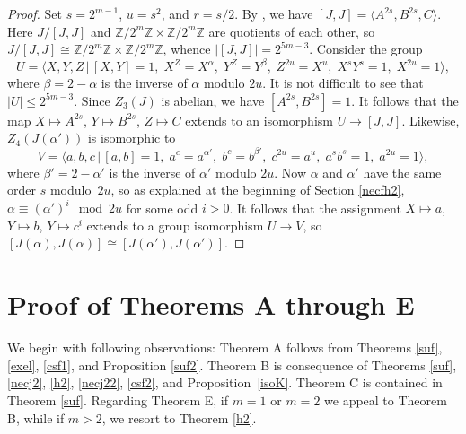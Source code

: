 \documentclass{amsart}
\newtheorem{note}[theorem]{Note}
\theoremstyle{definition}
\theoremstyle{remark}
\newcommand \Z{{\mathbb Z}}
\begin{document}
\begin{proof}
Set $s=2^{m-1}$, $u=s^2$, and $r=s/2$. By \cite[Theorem 8.1]{MS}, we have $[J,J]=\langle A^{2s},B^{2s},C\rangle$.
Here $J/[J,J]$ and $\Z/2^{m}\Z\times \Z/2^{m}\Z$ are quotients of each other, so
$J/[J,J]\cong\Z/2^{m}\Z\times \Z/2^{m}\Z$, whence $|[J,J]|=2^{5m-3}$. Consider the group
\[
U=\langle X,Y,Z\,|\,
    [X,Y]=1,\;
    X^Z=X^\alpha,\;
    Y^Z=Y^{\beta},\;
    Z^{2u}=X^{u},\;
    X^{s}Y^{s}=1,\;
    X^{2u}=1\rangle,
 \]
where $\beta=2-\alpha$ is the inverse of $\alpha$ modulo $2u$.
It is not difficult to see that $|U|\leq 2^{5m-3}$. Since $Z_3(J)$ is abelian, we have $[A^{2s},B^{2s}]=1$.
It follows that the map $X\mapsto A^{2s}$, $Y\mapsto B^{2s}$, $Z\mapsto C$ extends to an isomorphism $U\to [J,J]$.
Likewise, $Z_4(J(\alpha'))$ is isomorphic to
$$
V=
\langle a,b,c\,|\,
    [a,b]=1,\;
    a^c=a^{\alpha'},\;
    b^c=b^{\beta'},\;
    c^{2u}=a^{u},\;
    a^{s}b^{s}=1,\;
    a^{2u}=1\rangle,
		$$
where $\beta'=2-\alpha'$ is the inverse of $\alpha'$ modulo $2u$.
Now $\alpha$ and $\alpha'$ have the same order $s$ modulo~$2u$, so as explained at the beginning of Section \ref{necfh2},
$\alpha\equiv (\alpha')^i\mod 2u$ for some odd $i>0$. It follows that the assignment
$X\mapsto a$, $Y\mapsto b$, $Y\mapsto c^i$ extends to a group isomorphism $U\to V$,
so $[J(\alpha),J(\alpha)]\cong [J(\alpha'),J(\alpha')]$.
\end{proof}



\section{Proof of Theorems A through E}

We begin with following observations: Theorem A follows from Theorems \ref{suf}, \ref{exel}, \ref{csf1}, and Proposition \ref{suf2}.
Theorem B is consequence of Theorems \ref{suf}, \ref{necj2}, \ref{h2}, \ref{necj22}, \ref{csf2}, and Proposition~\ref{isoK}.
Theorem C is contained in Theorem \ref{suf}. Regarding Theorem E, if $m=1$ or $m=2$ we appeal to Theorem B, while
if $m>2$, we resort to Theorem \ref{h2}.
\end{document}
